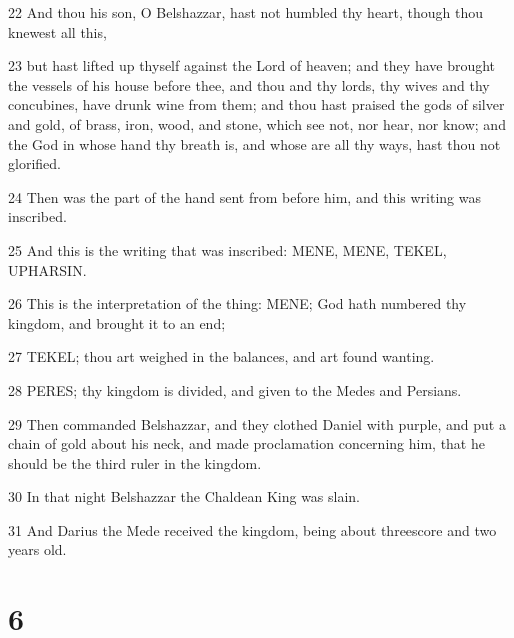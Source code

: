 \par 22 And thou his son, O Belshazzar, hast not humbled thy heart, though thou knewest all this,
\par 23 but hast lifted up thyself against the Lord of heaven; and they have brought the vessels of his house before thee, and thou and thy lords, thy wives and thy concubines, have drunk wine from them; and thou hast praised the gods of silver and gold, of brass, iron, wood, and stone, which see not, nor hear, nor know; and the God in whose hand thy breath is, and whose are all thy ways, hast thou not glorified.
\par 24 Then was the part of the hand sent from before him, and this writing was inscribed.
\par 25 And this is the writing that was inscribed: MENE, MENE, TEKEL, UPHARSIN.
\par 26 This is the interpretation of the thing: MENE; God hath numbered thy kingdom, and brought it to an end;
\par 27 TEKEL; thou art weighed in the balances, and art found wanting.
\par 28 PERES; thy kingdom is divided, and given to the Medes and Persians.
\par 29 Then commanded Belshazzar, and they clothed Daniel with purple, and put a chain of gold about his neck, and made proclamation concerning him, that he should be the third ruler in the kingdom.
\par 30 In that night Belshazzar the Chaldean King was slain.
\par 31 And Darius the Mede received the kingdom, being about threescore and two years old.

\chapter{6}

